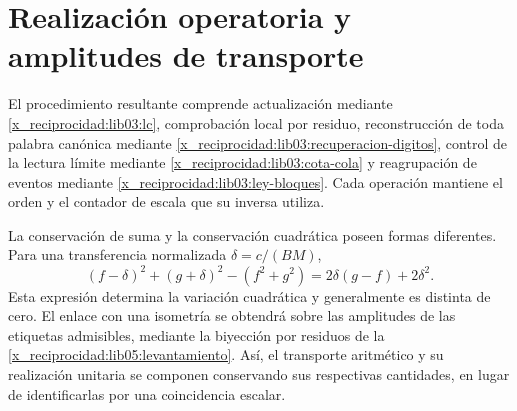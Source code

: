 \section{Realización operatoria y amplitudes de transporte}
\label{x_reciprocidad:lib03:operativo}

El procedimiento resultante comprende actualización mediante
\eqref{x_reciprocidad:lib03:lc}, comprobación local por residuo, reconstrucción de
toda palabra canónica mediante \eqref{x_reciprocidad:lib03:recuperacion-digitos},
control de la lectura límite mediante \eqref{x_reciprocidad:lib03:cota-cola} y
reagrupación de eventos mediante \eqref{x_reciprocidad:lib03:ley-bloques}. Cada
operación mantiene el orden y el contador de escala que su inversa
utiliza.

La conservación de suma y la conservación cuadrática poseen formas
diferentes. Para una transferencia normalizada
\(\delta=c/(BM)\),
\begin{equation}
 (f-\delta)^2+(g+\delta)^2-(f^2+g^2)
 =2\delta(g-f)+2\delta^2.
 \label{x_reciprocidad:lib03:variacion-cuadratica}
\end{equation}
Esta expresión determina la variación cuadrática y generalmente es
distinta de cero. El enlace con una isometría se obtendrá sobre las
amplitudes de las etiquetas admisibles, mediante la biyección por
residuos de la \cref{x_reciprocidad:lib05:levantamiento}. Así, el transporte aritmético
y su realización unitaria se componen conservando sus respectivas
cantidades, en lugar de identificarlas por una coincidencia escalar.
